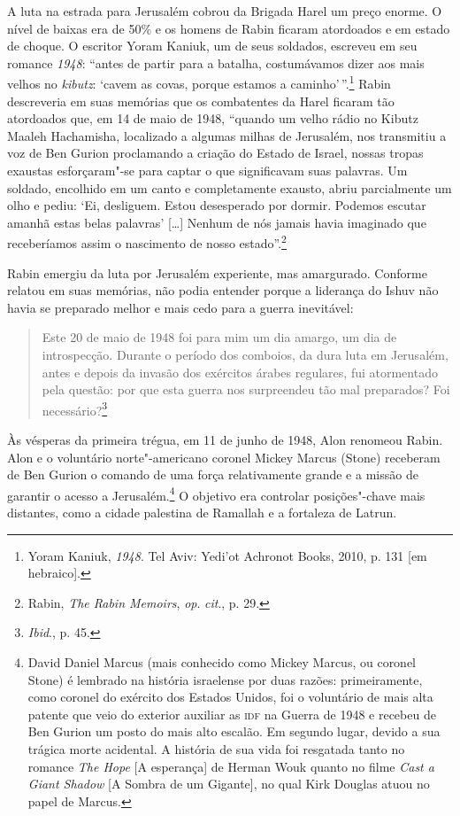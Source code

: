 A luta na estrada para Jerusalém cobrou da Brigada Harel um preço
enorme. O nível de baixas era de 50\% e os homens de Rabin ficaram
atordoados e em estado de choque. O escritor Yoram Kaniuk, um de seus
soldados, escreveu em seu romance \emph{1948}: ``antes de partir para a
batalha, costumávamos dizer aos mais velhos no \emph{kibutz}: `cavem as covas,
porque estamos a caminho'\,''.\footnote{Yoram Kaniuk, \emph{1948}. Tel Aviv: Yedi'ot Achronot Books, 2010, p. 131 {[}em hebraico{]}.} Rabin descreveria em suas
memórias que os combatentes da Harel ficaram tão atordoados que, em 14
de maio de 1948, ``quando um velho rádio no Kibutz Maaleh Hachamisha,
localizado a algumas milhas de Jerusalém, nos transmitiu a voz de Ben
Gurion proclamando a criação do Estado de Israel, nossas tropas exaustas
esforçaram"-se para captar o que significavam suas palavras. Um soldado,
encolhido em um canto e completamente exausto, abriu parcialmente um olho e
pediu: `Ei, desliguem. Estou desesperado por dormir. Podemos escutar
amanhã estas belas palavras' {[}\ldots{}{]} Nenhum de nós jamais havia imaginado que
receberíamos assim o nascimento de nosso estado''.\footnote{Rabin,
\emph{The Rabin Memoirs}, \emph{op}. \emph{cit}., p. 29.}

Rabin emergiu da luta por Jerusalém experiente, mas amargurado. Conforme
relatou em suas memórias, não podia entender porque a liderança do
Ishuv não havia se preparado melhor e mais cedo para a guerra
inevitável: 

\begin{quote}
Este 20 de maio de 1948 foi para mim um dia amargo, um dia
de introspecção. Durante o período dos comboios, da dura luta em
Jerusalém, antes e depois da invasão dos exércitos árabes regulares, fui
atormentado pela questão: por que esta guerra nos surpreendeu tão mal
preparados? Foi necessário?\footnote{\emph{Ibid}., p. 45.}
\end{quote}

Às vésperas da primeira trégua, em 11 de junho de 1948, Alon renomeou
Rabin. Alon e o voluntário norte"-americano coronel Mickey Marcus (Stone)
receberam de Ben Gurion o comando de uma força relativamente grande e a
missão de garantir o acesso a Jerusalém.\footnote{David Daniel Marcus 
(mais conhecido como Mickey Marcus, ou coronel Stone) é lembrado na história israelense
por duas razões: primeiramente, como coronel do exército
dos Estados Unidos, foi o voluntário de mais alta patente que veio do
exterior auxiliar as \textsc{idf} na Guerra de 1948 e recebeu de Ben Gurion um
posto do mais alto escalão. Em segundo lugar, devido a sua trágica morte
acidental. A história de sua vida foi resgatada tanto no romance \emph{The Hope} {[}A esperança{]} de
Herman Wouk quanto no filme \emph{Cast a Giant Shadow} {[}A Sombra de um
Gigante{]}, no qual Kirk Douglas atuou no papel de Marcus.} O objetivo era controlar
posições"-chave mais distantes, como a cidade palestina de Ramallah e a
fortaleza de Latrun.

